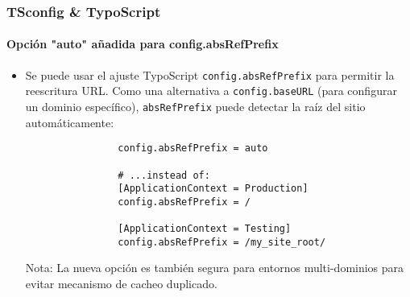 \begin{frame}[fragile]
	\frametitle{TSconfig \& TypoScript}
	\framesubtitle{Opción "auto" añadida para config.absRefPrefix}

	\begin{itemize}
		\item Se puede usar el ajuste TypoScript \texttt{config.absRefPrefix} para permitir la reescritura URL.
			Como una alternativa a \texttt{config.baseURL} (para configurar un dominio específico), \texttt{absRefPrefix} puede detectar la raíz del sitio automáticamente:

			\begin{lstlisting}
				config.absRefPrefix = auto

				# ...instead of:
				[ApplicationContext = Production]
				config.absRefPrefix = /

				[ApplicationContext = Testing]
				config.absRefPrefix = /my_site_root/
			\end{lstlisting}

		\smaller
			Nota: La nueva opción es también segura para entornos multi-dominios para evitar
			mecanismo de cacheo duplicado.
		\normalsize

	\end{itemize}

\end{frame}


